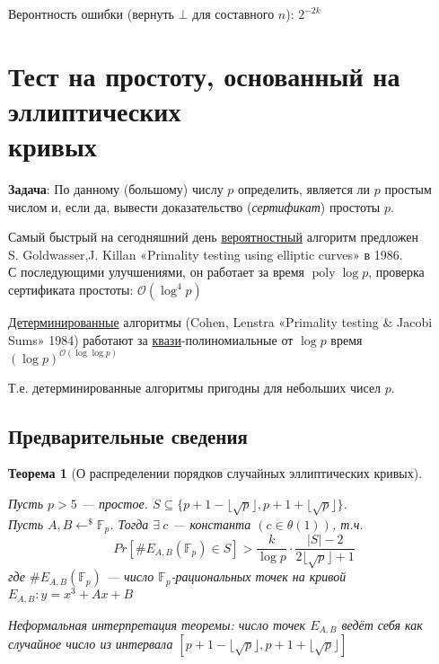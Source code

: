 \documentclass[12pt]{article}
\newcommand{\F}{{{\mathbb F}}}
\newcommand{\bigO}{\mathcal{O}}
\newtheorem{theorem}{Теорема}
\theoremstyle{definition}
\theoremstyle{definition}
\theoremstyle{definition}
\begin{document}
Веронтность ошибки (вернуть $\bot$ для составного $n$): $2^{-2k}$


\section{Тест на простоту, основанный на эллиптических\\ кривых}

\textbf{Задача}: По данному (большому) числу $p$ определить, является ли $p$ простым числом и, если да, вывести доказательство (\textit{сертификат}) простоты $p$. 

Самый быстрый на сегодняшний день \underline{вероятностный} алгоритм предложен\\ S. Goldwasser,J. Killan «Primality testing using elliptic curves» в 1986.\\ С последующими улучшениями, он работает за время $\operatorname{poly}\log p$, проверка сертификата простоты: $\bigO(\log^4 p)$

\underline{Детерминированные} алгоритмы (Cohen, Lenstra «Primality testing \& Jacobi Sums» 1984) работают за \underline{квази}-полиномиальные от $\log p$ время $(\log p)^{\bigO(\log\log p)}$

Т.е. детерминированные алгоритмы пригодны для небольших чисел $p$.

\subsection{Предварительные сведения}

\begin{theorem}[О распределении порядков случайных эллиптических кривых]
\label{t1}

Пусть $p>5$ — простое. $S \subseteq \{ p+1-\lfloor\sqrt{p}\rfloor, p+1+\lfloor\sqrt{p}\rfloor \}$.\\
Пусть $A, B \leftarrow^{\$} \F_p$. Тогда $\exists\ c$ — константа $(c \in \theta(1))$, т.ч.
\[
    Pr\left[\#E_{A,B}(\F_p) \in S \right] > \frac{k}{\log p} \cdot \frac{|S|-2}{2\lfloor\sqrt{p}\rfloor + 1}
\]
где $\#E_{A,B}(\F_p)$ — число $\F_p$-рациональных точек на кривой $E_{A,B}: y = x^3 + Ax+B$

Неформальная интерпретация теоремы: число точек $E_{A,B}$ ведёт себя как случайное число из интервала $\left[p+1-\lfloor\sqrt{p}\rfloor, p+1+\lfloor\sqrt{p}\rfloor \right]$
\end{theorem}
\end{document}
